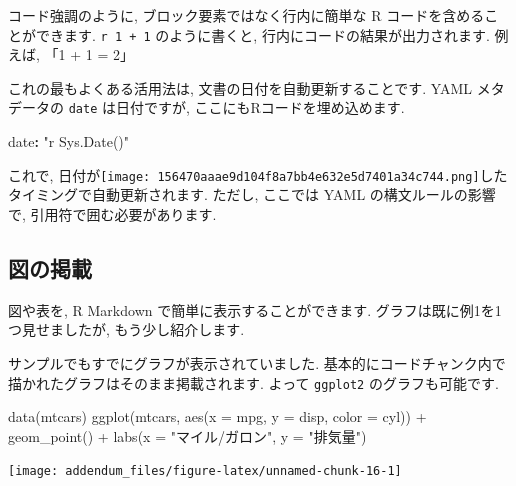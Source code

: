 \documentclass[
]{ltjsarticle}
\newenvironment{Shaded}{\begin{snugshade}}{\end{snugshade}}
\newcommand{\AttributeTok}[1]{\textcolor[rgb]{0.77,0.63,0.00}{#1}}
\newcommand{\FunctionTok}[1]{\textcolor[rgb]{0.00,0.00,0.00}{#1}}
\newcommand{\KeywordTok}[1]{\textcolor[rgb]{0.13,0.29,0.53}{\textbf{#1}}}
\newcommand{\NormalTok}[1]{#1}
\newcommand{\SpecialCharTok}[1]{\textcolor[rgb]{0.00,0.00,0.00}{#1}}
\newcommand{\StringTok}[1]{\textcolor[rgb]{0.31,0.60,0.02}{#1}}
\begin{document}
コード強調のように, ブロック要素ではなく行内に簡単な R コードを含めることができます. \texttt{\textasciigrave{}r\ 1\ +\ 1\textasciigrave{}} のように書くと, 行内にコードの結果が出力されます. 例えば, 「1 + 1 = 2」

これの最もよくある活用法は, 文書の日付を自動更新することです. YAML メタデータの \texttt{date} は日付ですが, ここにもRコードを埋め込めます.

\begin{Shaded}
\begin{Highlighting}[]
\FunctionTok{date}\KeywordTok{:}\AttributeTok{ }\StringTok{"\textasciigrave{}r Sys.Date()\textasciigrave{}"}
\end{Highlighting}
\end{Shaded}

これで, 日付が\texttt{[image: 156470aaae9d104f8a7bb4e632e5d7401a34c744.png]}したタイミングで自動更新されます. ただし, ここでは YAML の構文ルールの影響で, 引用符で囲む必要があります.

\hypertarget{figure-tables}{%
\subsection{図の掲載}\label{figure-tables}}

図や表を, R Markdown で簡単に表示することができます. グラフは既に例1を1つ見せましたが, もう少し紹介します.

サンプルでもすでにグラフが表示されていました. 基本的にコードチャンク内で描かれたグラフはそのまま掲載されます. よって \texttt{ggplot2} のグラフも可能です.

\begin{Shaded}
\begin{Highlighting}[numbers=left,,]
\FunctionTok{data}\NormalTok{(mtcars)}
\FunctionTok{ggplot}\NormalTok{(mtcars, }\FunctionTok{aes}\NormalTok{(}\AttributeTok{x =}\NormalTok{ mpg, }\AttributeTok{y =}\NormalTok{ disp, }\AttributeTok{color =}\NormalTok{ cyl)) }\SpecialCharTok{+}
  \FunctionTok{geom\_point}\NormalTok{() }\SpecialCharTok{+}
  \FunctionTok{labs}\NormalTok{(}\AttributeTok{x =} \StringTok{"マイル/ガロン"}\NormalTok{, }\AttributeTok{y =} \StringTok{"排気量"}\NormalTok{)}
\end{Highlighting}
\end{Shaded}

\begin{center}\texttt{[image: addendum\_files/figure-latex/unnamed-chunk-16-1]} \end{center}
\end{document}
